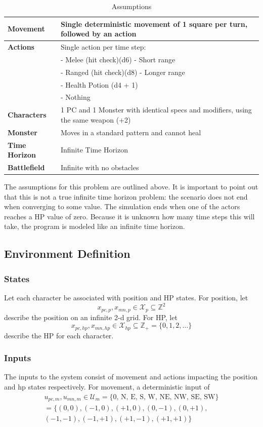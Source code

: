 \documentclass[letterpaper, 10 pt, conference]{ieeeconf}
\newcommand{\Z}{\mathbb{Z}}
\begin{document}
\begin{table}[h]
\centering
\caption{Assumptions}
\label{tab:assumptions}
\begin{tabular}{|l|p{6cm}|}
\hline
\textbf{Movement} & Single deterministic movement of 1 square per turn, followed by an action \\
\hline
\textbf{Actions} & Single action per time step: \\
& - Melee (hit check)(d6) - Short range \\
& - Ranged (hit check)(d8) - Longer range \\
& - Health Potion (d4 + 1) \\
& - Nothing \\
\hline
\textbf{Characters} & 1 PC and 1 Monster with identical specs and modifiers, using the same weapon (+2) \\
\hline
\textbf{Monster} & Moves in a standard pattern and cannot heal \\
\hline
\textbf{Time Horizon} & Infinite Time Horizon \\
\hline
\textbf{Battlefield} & Infinite with no obstacles \\
\hline
\end{tabular}
\end{table}

The assumptions for this problem are outlined above. It is important to point out that this is not a true infinite time horizon problem: the scenario does not end when converging to
some value. The simulation ends when one of the actors reaches a HP value of zero. Because it is unknown how many time steps this will take, the program is modeled like an infinite time horizon.

\subsection{Environment Definition}
\subsubsection{States}
Let each character be associated with position and HP states.
For position, let \[
    x_{pc,p}, x_{mn,p} \in \mathcal{X}_{p} \subseteq \Z^{2}
\] describe the position on an infinite 2-d grid.
For HP, let \[
    x_{pc,hp}, x_{mn,hp} \in \mathcal{X}_{hp} \subseteq \Z_+ = \{0, 1, 2, \dots\}
\] describe the HP for each character.

\subsubsection{Inputs}
The inputs to the system consist of movement and actions impacting the position and hp states respectively.
For movement, a deterministic input of 
\begin{multline}
    u_{pc,m}, u_{mn,m} \in \mathcal{U}_{m} = \text{\{0, N, E, S, W, NE, NW, SE, SW\}}\\
    =\{(0,0),(-1,0), (+1,0),(0,-1), (0,+1), \\ (-1,-1), (-1,+1), (+1,-1),(+1,+1)\}
\end{multline}
\end{document}
